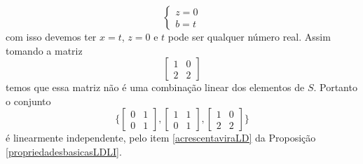 \begin{exemplos}
\begin{exemplos}
\begin{solucao}
\begin{enumerate}
\[\begin{cases}
            z = 0\\
            b = t
          \end{cases}
        \]
        com isso devemos ter $x = t$, $z = 0$ e $t$ pode ser qualquer número real. Assim tomando a matriz
        \[
          \begin{bmatrix}
            1 & 0\\
            2 & 2
          \end{bmatrix}
        \]
        temos que essa matriz não é uma combinação linear dos elementos de $S$. Portanto o conjunto
        \[
          \{\begin{bmatrix}0 & 1\\0 & 1\end{bmatrix}, \begin{bmatrix}1 & 1\\0 & 1\end{bmatrix}, \begin{bmatrix}1 & 0\\2 & 2\end{bmatrix}\}
        \]
        é linearmente independente, pelo item \ref{acrescentaviraLD} da Proposição \ref{propriedadesbasicasLDLI}.


\end{enumerate}
\end{solucao}
\end{exemplos}
\end{exemplos}
